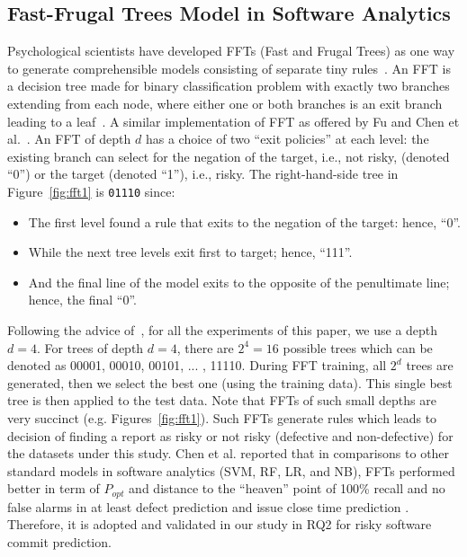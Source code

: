 \documentclass[10pt,conference]{IEEEtran}
\newcommand{\bi}{\begin{itemize}[leftmargin=0.4cm]}
\newcommand{\ei}{\end{itemize}}
\begin{document}
\subsection{Fast-Frugal Trees Model in Software Analytics}

Psychological scientists have developed FFTs (Fast and Frugal Trees) as one way to generate comprehensible models consisting of separate tiny rules~\cite{phillips2017fftrees,di18_fft,martignon2008categorization,agrawal18_fft,agrawal2019dodge}. An FFT is a decision tree made for binary classification problem with exactly two branches extending from each node, where either one or both branches is an exit branch leading to a leaf~\cite{martignon2008categorization}. 
 A similar implementation of FFT as offered by Fu and Chen et al.~\cite{fu2018building,di18_fft}. 
An FFT of depth $d$ has a choice of two ``exit policies'' at each level: the existing branch can select for the negation of the target, i.e., not risky, (denoted ``0'') or the target (denoted ``1''), i.e., risky.
The right-hand-side tree in Figure~\ref{fig:fft1} is \texttt{01110} since:
\bi
\item
The first level found a rule that exits to the negation of the target: hence, ``0''.
\item
While the next tree levels exit first to target; hence, ``111''.
\item
And the final line of the model exits
to the opposite of the penultimate line; hence, the final ``0''.
\ei



Following the advice of~\cite{fu2018building,di18_fft,phillips2017fftrees}, for all the experiments of this paper, we use a depth    $d=4$. 
For trees of depth $d=4$, there are $2^4=16$ possible trees which can be denoted as 00001, 00010, 00101, ... , 11110. During FFT training, all $2^d$ trees are generated, then we select the best one (using the training data).
 This single best tree is then applied to the test data.
 Note that FFTs of such small
depths are very succinct
(e.g. Figures~\ref{fig:fft1}). Such FFTs generate rules which leads to decision of finding a report as risky or not risky (defective and non-defective) for the datasets under this study. Chen et al. reported that in comparisons to other standard models in software analytics (SVM, RF, LR, and NB), FFTs performed better in term of $P_{opt}$ and distance to the ``heaven'' point of 100\% recall and no false alarms in at least defect prediction and issue close time prediction  \cite{di18_fft}. Therefore, it is adopted and validated in our study in RQ2 for risky software commit prediction. 
\end{document}
